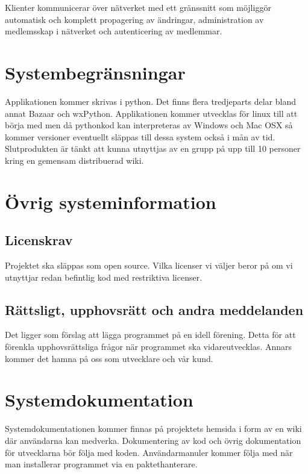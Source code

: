 Klienter kommunicerar över nätverket med ett gränssnitt som möjliggör automatisk och komplett propagering av ändringar, administration av medlemsskap i nätverket och autenticering av medlemmar. 


\section{Systembegränsningar}
Applikationen kommer skrivas i python. Det finns flera tredjeparts delar bland annat Bazaar och wxPython. Applikationen kommer utvecklas för linux till att börja med men då pythonkod kan interpreteras av Windows och Mac OSX så kommer versioner eventuellt släppas till dessa system också i mån av tid. Slutprodukten är tänkt att kunna utnyttjas av en grupp på upp till 10 personer kring en gemensam distribuerad wiki.

\section{Övrig systeminformation} %

\subsection{Licenskrav}
Projektet ska släppas som open source. Vilka licenser vi väljer beror på om vi utnyttjar redan befintlig kod med restriktiva licenser.

\subsection{Rättsligt, upphovsrätt och andra meddelanden}
Det ligger som förslag att lägga programmet på en idell förening. Detta för att förenkla upphovsrättsliga frågor när programmet ska vidareutvecklas. Annars kommer det hamna på oss som utvecklare och vår kund. 


\section{Systemdokumentation}
Systemdokumentationen kommer finnas på projektets hemsida i form av en wiki där användarna kan medverka. Dokumentering av kod och övrig dokumentation för utvecklarna bör följa med koden. Användarmanuler kommer följa med när man installerar programmet via en paktethanterare. %


